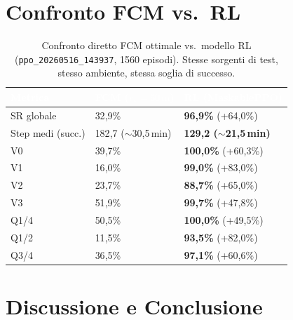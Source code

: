 \documentclass[12pt, a4paper]{article}
\begin{document}
\section{Confronto FCM vs.\ RL}

\begin{table}[H]
\centering
\renewcommand{\arraystretch}{1.3}
\small
\begin{tabular}{L{4cm} C{3.5cm} C{3.5cm}}
\toprule
{}
\textcolor{white}{\textbf{Metrica}} &
\textcolor{white}{\textbf{FCM ($r_s{=}50\,\text{m}$)}} &
\textcolor{white}{\textbf{RL (MaskablePPO)}} \\
\midrule
{}
SR globale          & 32{,}9\%  & \textbf{96{,}9\%} {\scriptsize\textcolor{green!50!black}{(+64{,}0\%)}} \\
Step medi (succ.)   & 182{,}7 ($\sim$30{,}5\,min)  & \textbf{129{,}2 ($\sim$21{,}5\,min)} \\
V0                  & 39{,}7\%  & \textbf{100{,}0\%} {\scriptsize\textcolor{green!50!black}{(+60{,}3\%)}} \\
V1                  & 16{,}0\%  & \textbf{99{,}0\%}  {\scriptsize\textcolor{green!50!black}{(+83{,}0\%)}} \\
V2                  & 23{,}7\%  & \textbf{88{,}7\%}  {\scriptsize\textcolor{green!50!black}{(+65{,}0\%)}} \\
V3                  & 51{,}9\%  & \textbf{99{,}7\%}  {\scriptsize\textcolor{green!50!black}{(+47{,}8\%)}} \\
Q1/4                & 50{,}5\%  & \textbf{100{,}0\%} {\scriptsize\textcolor{green!50!black}{(+49{,}5\%)}} \\
Q1/2                & 11{,}5\%  & \textbf{93{,}5\%}  {\scriptsize\textcolor{green!50!black}{(+82{,}0\%)}} \\
Q3/4                & 36{,}5\%  & \textbf{97{,}1\%}  {\scriptsize\textcolor{green!50!black}{(+60{,}6\%)}} \\
\bottomrule
\end{tabular}
\caption{Confronto diretto FCM ottimale vs.\ modello RL (\texttt{ppo\_20260516\_143937}, 1560 episodi).
         Stesse sorgenti di test, stesso ambiente, stessa soglia di successo.}
\end{table}

\section{Discussione e Conclusione}
\end{document}
